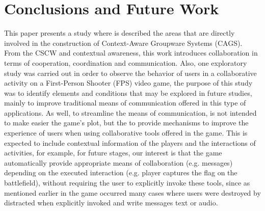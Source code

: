 \documentclass{./sty/llncs}
\begin{document}
\section{Conclusions and Future Work}
\label{sec:conclusion}
This paper presents a study where is described the areas that are directly involved in the construction of Context-Aware Groupware Systems (CAGS). From the CSCW and contextual awareness, this work introduces collaboration in terms of cooperation, coordination and communication. Also, one exploratory study was carried out in order to observe the behavior of users in a collaborative activity on a First-Person Shooter (FPS) video game, the purpose of this study was to identify elements and conditions that may be explored in future studies, mainly to improve traditional means of communication offered in this type of applications. As well, to streamline the means of communication, is not intended to make easier the game's plot, but the to provide mechanisms to improve the experience of users when using collaborative tools offered in the game. This is expected to include contextual information of the players and the interactions of activities, for example, for future stages, our interest is that the game automatically provide appropriate means of collaboration (e.g. messages) depending on the executed interaction (e.g. player captures the flag on the battlefield), without requiring the user to explicitly invoke these tools, since as mentioned earlier in the game occurred many cases where users were destroyed by distracted when explicitly invoked and write messages text or audio.




\end{document}
